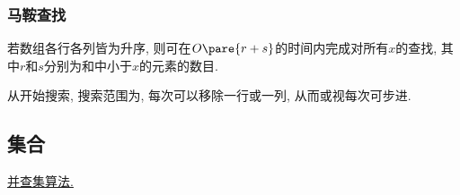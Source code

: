 \documentclass{ctexart}
\begin{document}

\subsubsection{马鞍查找} %
\label{ssub:马鞍查找}

若数组各行各列皆为升序, 则可在$O\pare{r+s}$的时间内完成对所有$x$的查找, 其中$r$和$s$分别为和中小于$x$的元素的数目.
\par
从开始搜索, 搜索范围为, 每次可以移除一行或一列, 从而或视每次可步进.



\subsection{集合} %
\label{sub:集合}

\href{https://en.wikipedia.org/wiki/Disjoint-set_data_structure}{并查集算法.}


\end{document}

